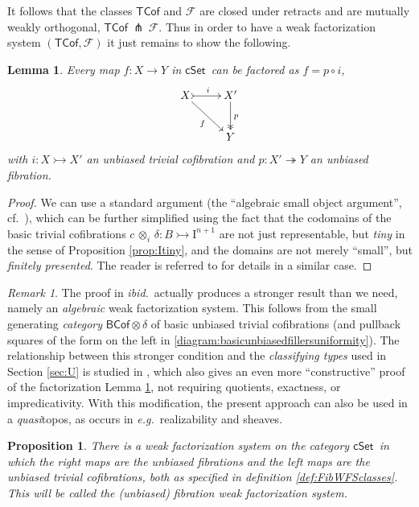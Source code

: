\documentclass[11pt,reqno]{amsart}
\newcommand{\eg}{\emph{e.g.}}
\newcommand{\ibid}{\emph{ibid.}}
\newcommand{\cSet}{\ensuremath{\mathsf{cSet}}}
\newcommand{\mono}{\ensuremath{\rightarrowtail}}
\newcommand{\ra}{\ensuremath{\rightarrow}}
\newcommand{\onto}{\ensuremath{\twoheadrightarrow}}
\newcommand{\I}{\ensuremath{\mathrm{I}}}
\newtheorem{proposition}[theorem]{Proposition}
\newtheorem{lemma}[theorem]{Lemma}
\theoremstyle{remark}
\newtheorem{remark}[theorem]{Remark}
\theoremstyle{definition}
\begin{document}
It follows that the classes $\mathsf{TCof}$ and $\mathcal{F}$ are closed under retracts and are mutually weakly orthogonal, $\mathsf{TCof}\ {\pitchfork}\ \mathcal{F}$.
Thus in order to have a weak factorization system $(\mathsf{TCof}, \mathcal{F})$ it just remains to show the following.

\begin{lemma}\label{lemma:factorization}
Every map $f: X\ra Y$ in \cSet\ can be factored as $f  = p\circ i$,
\begin{equation}
\xymatrix{
X \ar[rd]_{f} \ar@{>->}[r]^i & X'\ar@{->>}[d]^p\\
& Y
}
\end{equation}
with $i: X\mono X'$ an unbiased trivial cofibration and $p: X'\onto Y$ an unbiased fibration.
\end{lemma}
%
\begin{proof}
We can use a standard argument (the ``algebraic small object argument'', cf.~\cite{garner:small-object-argument,riehl-algebraic-model}), which can be further simplified using the fact that the codomains of the basic trivial cofibrations $c\, \otimes_i \,\delta : B \mono \I^{n+1}$ are not just representable, but \emph{tiny} in the sense of Proposition \ref{prop:Itiny}, and the domains are not merely ``small'', but \emph{finitely presented}.  The reader is referred to \cite{Awodey:cubical-model} for details in a similar case.
\end{proof}
%

\begin{remark}\label{remak:constructive}
The proof in \ibid\ actually produces a stronger result than we need, namely an \emph{algebraic} weak factorization system.  This follows from the small generating \emph{category} $\mathsf{BCof}\otimes \delta$  of basic unbiased trivial cofibrations (and pullback squares of the form on the left in \eqref{diagram:basicunbiasedfillersuniformity}).  The relationship between this stronger condition and the \emph{classifying types} used in Section \ref{sec:U} is studied in \cite{Swan:Wtypes}, which also gives an even more ``constructive'' proof of the factorization Lemma \ref{lemma:factorization}, not requiring quotients, exactness, or impredicativity.  With this modification, the present approach can also be used in a \emph{quasi}topos, as occurs in \eg\ realizability and sheaves.
\end{remark}

\begin{proposition}\label{prop:fibrationwfs}
There is a weak factorization system on the category \cSet\ in which the right maps are the unbiased fibrations and the left maps are the unbiased trivial cofibrations, both as specified in definition \ref{def:FibWFSclasses}.  This will be called the \emph{(unbiased) fibration weak factorization system}.
\end{proposition}
\end{document}
